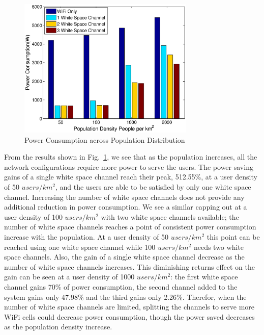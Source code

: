 \begin{figure}[hpt]
\vspace{-0.1in}
\centering
\includegraphics[width=84mm]{figures/populationvary}
\vspace{-0.1in}
\caption{Power Consumption across Population Distribution}
\label{fig:populationvary}
\vspace{-0.1in}
\end{figure}

From the results shown in Fig.~\ref{fig:populationvary}, we see that as the population increases, all the network configurations require more power to serve the users.
The power saving gains of a single white space channel reach their peak, 512.55\%, at a user density of 50 $users/km^2$, and the users are able to be satisfied by only one white space channel. 
Increasing the number of white space channels does not provide any additional reduction in power consumption. 
We see a similar capping out at a user density of 100 $users/km^2$ with two white space channels available; the number of white space channels reaches a point of consistent power consumption increase with the population. 
At a user density of 50 $users/km^2$ this point can be reached using one white space channel while 100 $users/km^2$ needs two white space channels. 
Also, the gain of a single white space channel decrease as the number of white space channels increases.
This diminishing returns effect on the gain can be seen at a user density of 1000 $users/km^2$: the first white space channel gains 70\% of power consumption, the second channel added to the system gains only 47.98\% and the third gains only 2.26\%. 
Therefor, when the number of white space channels are limited, splitting the channels to serve more WiFi cells could decrease power consumption, though the power saved decreases as the population density increase. 





